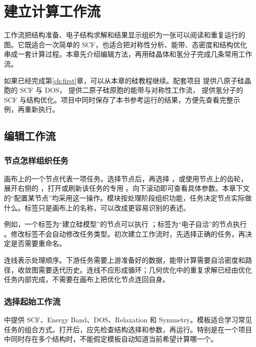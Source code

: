 \chapter{建立计算工作流}\label{ch:workflows}

工作流把结构准备、电子结构求解和结果显示组织为一张可以阅读和重复运行的图。它既适合一次简单的 SCF，也适合把对称性分析、能带、态密度和结构优化串成一套计算过程。本章先介绍编辑方法，再用硅晶体和氢分子完成几条常用工作流。

如果已经完成第\ref{ch:first}章，可以从本章的硅教程继续。配套项目  提供八原子硅晶胞的 SCF 与 DOS， 提供二原子硅原胞的能带与对称性工作流， 提供氢分子的 SCF 与结构优化。项目中同时保存了本书参考运行的结果，方便先查看完整示例，再重新执行。

\section{编辑工作流}

\subsection{节点怎样组织任务}

画布上的一个节点代表一项任务。选择节点后，再选择 ，或使用节点上的齿轮，展开右侧的 ，打开或刷新该任务的专用 。向下滚动即可查看具体参数。本章下文的“配置某节点”均采用这一操作。模块按处理阶段组织功能，任务决定节点实际做什么。标签只是画布上的名称，可以改成更容易识别的表述。

例如，一个标签为“建立硅模型”的节点可以执行 ；标签为“电子自洽”的节点执行 。修改标签不会自动修改任务类型。初次建立工作流时，先选择正确的任务，再决定是否需要重命名。

连线表示处理顺序。下游任务需要上游准备好的数据，能带计算需要自洽密度和路径，收敛图需要迭代历史。连线不应形成循环；几何优化中的重复求解已经由优化任务内部完成，不需要在画布上把优化节点连回自身。

\subsection{选择起始工作流}

 中提供 SCF、Energy Band、DOS、Relaxation 和 Symmetry。模板适合学习常见任务的组合方式。打开后，应先检查结构选择和参数，再运行。特别是在一个项目中同时存在多个结构时，不能假定模板自动知道当前希望计算哪一个。

